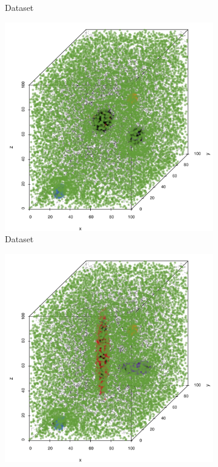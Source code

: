 \begin{figure}
\begin{subfigure}{0.23\textwidth}
			\caption{Dataset \baakmanTwo}
			\label{fig:discussion:anisotropy:baakman2}
		\end{subfigure}	
		\begin{subfigure}{0.23\textwidth}
			\centering
			\includegraphics[keepaspectratio=true, width=\textwidth, height=0.23\textheight]{discussion/img/ferdosi_3_120000_anisotropy.png}
			\caption{Dataset \ferdosiThree}
			\label{fig:discussion:anisotropy:ferdosi3}
		\end{subfigure}		
		\begin{subfigure}{0.23\textwidth}
			\centering
			\includegraphics[keepaspectratio=true, width=\textwidth, height=0.23\textheight]{discussion/img/baakman_3_60000_anisotropy.png}

\end{subfigure}
\end{figure}
